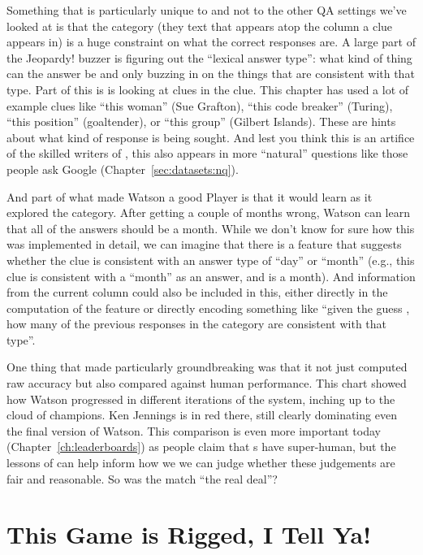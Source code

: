Something that is particularly unique to \jeopardy{} and not to the
other QA settings we’ve looked at is that the category (they text that appears
atop the column a clue appears in) is a huge
constraint on what the correct responses are.
%
A large part of the
Jeopardy! buzzer is figuring out the ``lexical answer type'': what kind of
thing can the answer be and only buzzing in on the things that are consistent
with that type.
%
Part of
this is is looking at clues in the clue.
%
This chapter has used a lot of example clues like ``this woman'' (Sue
Grafton), ``this code breaker'' (Turing), ``this position'' (goaltender), or
``this group'' (Gilbert Islands).
%
These are hints about what kind of response is being sought.
%
And lest you think this is an artifice of the skilled writers of \jeopardy{},
this also appears in more ``natural'' questions like those people ask Google
(Chapter~\ref{sec:datasets:nq}).

And part of what made Watson a good \jeopardy{} Player is that it would learn
as it explored the category.
%
After getting a couple of months wrong, Watson
can learn that all of the answers should be a month.
%
While we don't know for sure how this was implemented in detail, we can
imagine that there is a feature that suggests whether the clue is consistent
with an answer type of ``day'' or ``month'' (e.g., this clue is consistent
with a ``month'' as an answer, and  is a month).
%
And information from the current column could also be included in this, either
directly in the computation of the feature or directly encoding something like
``given the guess , how many of the previous responses in the
category are consistent with that type''.

One thing that made \watson{} particularly groundbreaking was that it not just
computed raw accuracy but also compared against human performance.
%
This chart showed how Watson progressed in different iterations of the system,
inching up to the cloud of \jeopardy{} champions.  Ken Jennings is in red there,
still clearly dominating even the final version of Watson.
%
This comparison is even more important today (Chapter~\ref{ch:leaderboards}) as people claim that s
have super-human, but the lessons of \watson{} can
help inform how we we can judge whether these judgements are fair and
reasonable.
%
So was the \watson{} match ``the real deal''?

\section{This Game is Rigged, I Tell Ya!}

